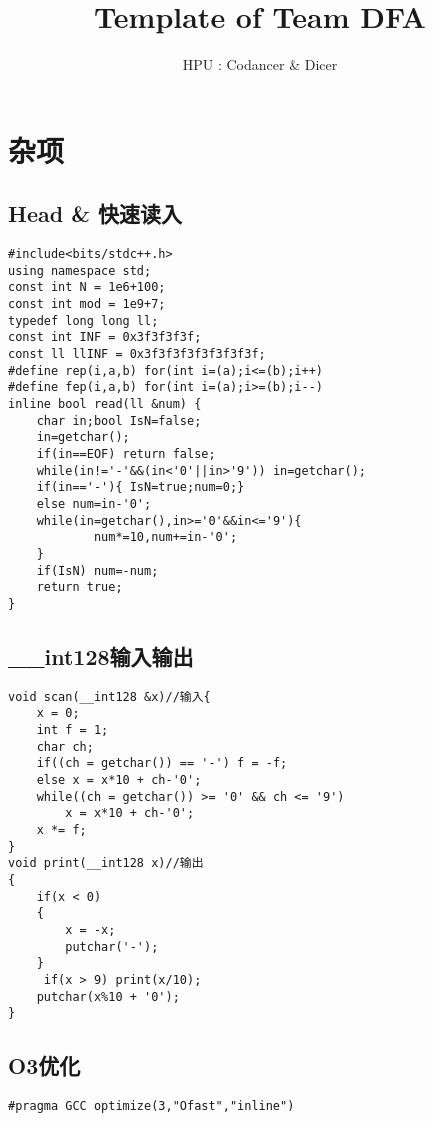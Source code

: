 \documentclass[twocolumn,a4]{article}
\title{\CJKfamily{hei} \bfseries Template of Team DFA}
\author{HPU :  Codancer \& Dicer}
\begin{document}
\small
\begin{titlepage}
\maketitle
\end{titlepage}

\newpage
\pagestyle{empty}
\renewcommand{\contentsname}{目录}
\tableofcontents
\newpage\clearpage
\newpage
\pagestyle{fancy}
\setcounter{page}{1}   %

\section{杂项}
\subsection{Head \&  快速读入}
\begin{lstlisting}
#include<bits/stdc++.h>
using namespace std;
const int N = 1e6+100;
const int mod = 1e9+7;
typedef long long ll;
const int INF = 0x3f3f3f3f;
const ll llINF = 0x3f3f3f3f3f3f3f3f;
#define rep(i,a,b) for(int i=(a);i<=(b);i++)
#define fep(i,a,b) for(int i=(a);i>=(b);i--)
inline bool read(ll &num) {
    char in;bool IsN=false;
    in=getchar();
    if(in==EOF) return false;
    while(in!='-'&&(in<'0'||in>'9')) in=getchar();
    if(in=='-'){ IsN=true;num=0;}
    else num=in-'0';
    while(in=getchar(),in>='0'&&in<='9'){
            num*=10,num+=in-'0';
    } 
    if(IsN) num=-num;
    return true;
}
\end{lstlisting}
\subsection{\_\_int128输入输出}
\begin{lstlisting}
void scan(__int128 &x)//输入{
    x = 0;
    int f = 1;
    char ch;
    if((ch = getchar()) == '-') f = -f;
    else x = x*10 + ch-'0';
    while((ch = getchar()) >= '0' && ch <= '9')
        x = x*10 + ch-'0';
    x *= f;
}
void print(__int128 x)//输出
{
    if(x < 0)
    {
        x = -x;
        putchar('-');
    }
     if(x > 9) print(x/10);
    putchar(x%10 + '0');
}
\end{lstlisting}
\subsection{O3优化}
\begin{lstlisting}
#pragma GCC optimize(3,"Ofast","inline")
\end{lstlisting}
\end{document}
